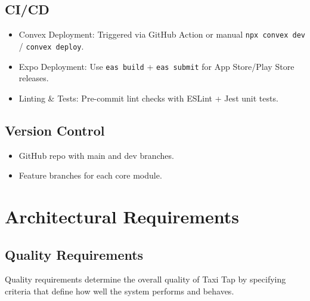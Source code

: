 \documentclass[a4paper,12pt]{article}
\begin{document}
\subsection{CI/CD}
\begin{itemize}
    \item Convex Deployment: Triggered via GitHub Action or manual \texttt{npx convex dev} / \texttt{convex deploy}.
    \item Expo Deployment: Use \texttt{eas build} + \texttt{eas submit} for App Store/Play Store releases.
    \item Linting \& Tests: Pre-commit lint checks with ESLint + Jest unit tests.
\end{itemize}

\subsection{Version Control}
\begin{itemize}
    \item GitHub repo with main and dev branches.
    \item Feature branches for each core module.
\end{itemize}

\section{Architectural Requirements}

\subsection{Quality Requirements}
Quality requirements determine the overall quality of Taxi Tap by specifying criteria that define how well the system performs and behaves.
\end{document}
